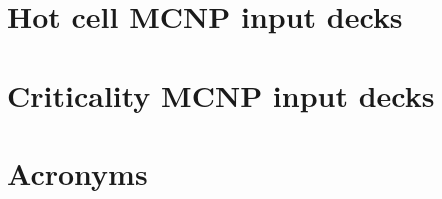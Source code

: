 \documentclass[11pt,a4paper]{article}
\begin{document}
\newpage




\begin{appendices}


    \renewcommand{\thesection}{\Roman{section}}


    \section{Hot cell MCNP input decks} \label{app-hot-cell}


\newpage


    \section{Criticality MCNP input decks} \label{app-crit}



\newpage


    \section{Acronyms}
    \printnoidxglossary[title={}]


\end{appendices}
\end{document}
